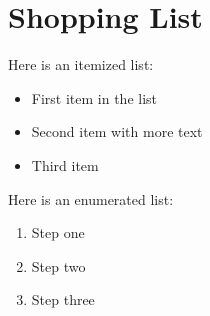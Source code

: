 \documentclass{article}
\begin{document}
\section{Shopping List}

Here is an itemized list:
\begin{itemize}
  \item First item in the list
  \item Second item with more text
  \item Third item
\end{itemize}

Here is an enumerated list:
\begin{enumerate}
  \item Step one
  \item Step two
  \item Step three
\end{enumerate}
\end{document}
